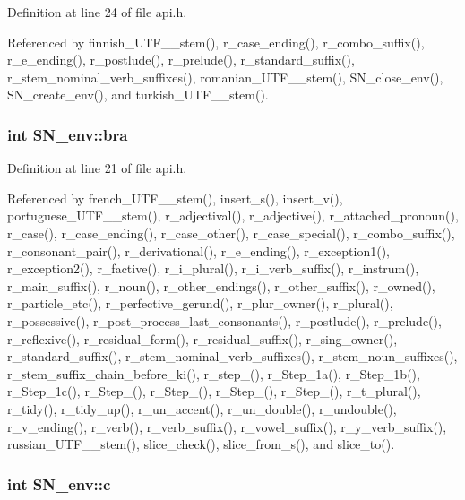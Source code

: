 Definition at line 24 of file api.h.

Referenced by finnish\_\-UTF\_\_\-stem(), r\_\-case\_\-ending(), r\_\-combo\_\-suffix(), r\_\-e\_\-ending(), r\_\-postlude(), r\_\-prelude(), r\_\-standard\_\-suffix(), r\_\-stem\_\-nominal\_\-verb\_\-suffixes(), romanian\_\-UTF\_\_\-stem(), SN\_\-close\_\-env(), SN\_\-create\_\-env(), and turkish\_\-UTF\_\_\-stem().\hypertarget{structSN__env_9768d567ce5406809557aeb40cad873e}{
\subsubsection[{bra}]{\setlength{\rightskip}{0pt plus 5cm}int {\bf SN\_\-env::bra}}}
\label{structSN__env_9768d567ce5406809557aeb40cad873e}




Definition at line 21 of file api.h.

Referenced by french\_\-UTF\_\_\-stem(), insert\_\-s(), insert\_\-v(), portuguese\_\-UTF\_\_\-stem(), r\_\-adjectival(), r\_\-adjective(), r\_\-attached\_\-pronoun(), r\_\-case(), r\_\-case\_\-ending(), r\_\-case\_\-other(), r\_\-case\_\-special(), r\_\-combo\_\-suffix(), r\_\-consonant\_\-pair(), r\_\-derivational(), r\_\-e\_\-ending(), r\_\-exception1(), r\_\-exception2(), r\_\-factive(), r\_\-i\_\-plural(), r\_\-i\_\-verb\_\-suffix(), r\_\-instrum(), r\_\-main\_\-suffix(), r\_\-noun(), r\_\-other\_\-endings(), r\_\-other\_\-suffix(), r\_\-owned(), r\_\-particle\_\-etc(), r\_\-perfective\_\-gerund(), r\_\-plur\_\-owner(), r\_\-plural(), r\_\-possessive(), r\_\-post\_\-process\_\-last\_\-consonants(), r\_\-postlude(), r\_\-prelude(), r\_\-reflexive(), r\_\-residual\_\-form(), r\_\-residual\_\-suffix(), r\_\-sing\_\-owner(), r\_\-standard\_\-suffix(), r\_\-stem\_\-nominal\_\-verb\_\-suffixes(), r\_\-stem\_\-noun\_\-suffixes(), r\_\-stem\_\-suffix\_\-chain\_\-before\_\-ki(), r\_\-step\_(), r\_\-Step\_\-1a(), r\_\-Step\_\-1b(), r\_\-Step\_\-1c(), r\_\-Step\_(), r\_\-Step\_(), r\_\-Step\_(), r\_\-Step\_(), r\_\-t\_\-plural(), r\_\-tidy(), r\_\-tidy\_\-up(), r\_\-un\_\-accent(), r\_\-un\_\-double(), r\_\-undouble(), r\_\-v\_\-ending(), r\_\-verb(), r\_\-verb\_\-suffix(), r\_\-vowel\_\-suffix(), r\_\-y\_\-verb\_\-suffix(), russian\_\-UTF\_\_\-stem(), slice\_\-check(), slice\_\-from\_\-s(), and slice\_\-to().\hypertarget{structSN__env_8b785d9fa1ff1610fe2b5d9e85207df6}{
\subsubsection[{c}]{\setlength{\rightskip}{0pt plus 5cm}int {\bf SN\_\-env::c}}}
\label{structSN__env_8b785d9fa1ff1610fe2b5d9e85207df6}




